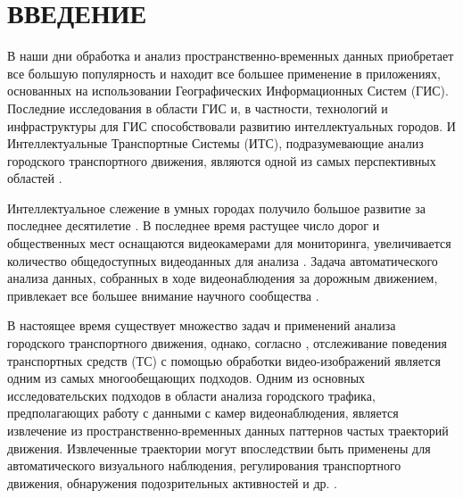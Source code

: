 \chapter{ВВЕДЕНИЕ}
\label{ch:ВВЕДЕНИЕ}

В наши дни обработка и анализ пространственно-временных данных приобретает все большую популярность и находит все большее применение в приложениях, основанных на использовании Географических Информационных Систем (ГИС). Последние исследования в области ГИС и, в частности, технологий и инфраструктуры для ГИС способствовали развитию интеллектуальных городов. И Интеллектуальные Транспортные Системы (ИТС), подразумевающие анализ городского транспортного движения, являются одной из самых перспективных областей \cite{article:2_survey_urban}.

Интеллектуальное слежение в умных городах получило большое развитие за последнее десятилетие \cite{article:9_trb_vc_aev_sc}. В последнее время растущее число дорог и общественных мест оснащаются видеокамерами для мониторинга, увеличивается количество общедоступных видеоданных для анализа \cite{article:4_detect_eatp}. Задача автоматического анализа данных, собранных в ходе видеонаблюдения за дорожным движением, привлекает все большее внимание научного сообщества \cite{inproceedings:21_ad_dbscan_tvs}.

В настоящее время существует множество задач и применений анализа городского транспортного движения, однако, согласно \cite{article:9_trb_vc_aev_sc}, отслеживание поведения транспортных средств (ТС) с помощью обработки видео-изображений является одним из самых многообещающих подходов. Одним из основных исследовательских подходов в области анализа городского трафика, предполагающих работу с данными с камер видеонаблюдения, является извлечение из пространственно-временных данных паттернов частых траекторий движения. Извлеченные траектории могут впоследствии быть применены для автоматического визуального наблюдения, регулирования транспортного движения, обнаружения подозрительных активностей и др. \cite{article:5_survey_tbsa}\cite{article:over_tod}. 

